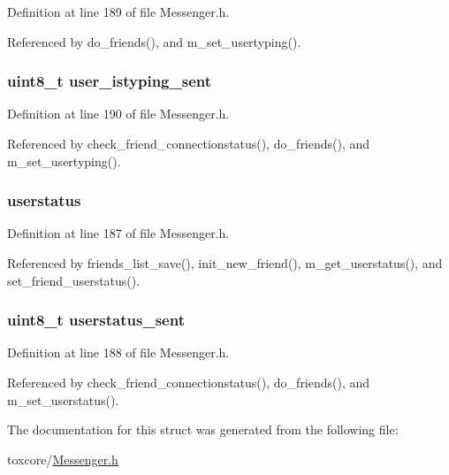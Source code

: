 Definition at line 189 of file Messenger.\+h.



Referenced by do\+\_\+friends(), and m\+\_\+set\+\_\+usertyping().

\hypertarget{struct_friend_a8d9e9aef86444e0cde8ec0314f60907e}{
\subsubsection[{user\+\_\+istyping\+\_\+sent}]{\setlength{\rightskip}{0pt plus 5cm}uint8\+\_\+t user\+\_\+istyping\+\_\+sent}}\label{struct_friend_a8d9e9aef86444e0cde8ec0314f60907e}


Definition at line 190 of file Messenger.\+h.



Referenced by check\+\_\+friend\+\_\+connectionstatus(), do\+\_\+friends(), and m\+\_\+set\+\_\+usertyping().

\hypertarget{struct_friend_adde524f5a15465585cbc2543cd0b2710}{
\subsubsection[{userstatus}]{ userstatus}}\label{struct_friend_adde524f5a15465585cbc2543cd0b2710}


Definition at line 187 of file Messenger.\+h.



Referenced by friends\+\_\+list\+\_\+save(), init\+\_\+new\+\_\+friend(), m\+\_\+get\+\_\+userstatus(), and set\+\_\+friend\+\_\+userstatus().

\hypertarget{struct_friend_af7c74fd36acb972c3a8641fb0781e37e}{
\subsubsection[{userstatus\+\_\+sent}]{\setlength{\rightskip}{0pt plus 5cm}uint8\+\_\+t userstatus\+\_\+sent}}\label{struct_friend_af7c74fd36acb972c3a8641fb0781e37e}


Definition at line 188 of file Messenger.\+h.



Referenced by check\+\_\+friend\+\_\+connectionstatus(), do\+\_\+friends(), and m\+\_\+set\+\_\+userstatus().



The documentation for this struct was generated from the following file\+:\begin{DoxyCompactItemize}
\item 
toxcore/\hyperlink{_messenger_8h}{Messenger.\+h}\end{DoxyCompactItemize}
